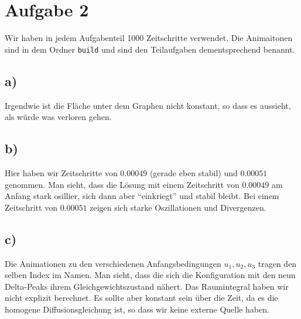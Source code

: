\section{Aufgabe 2}
Wir haben in jedem Aufgabenteil 1000 Zeitschritte verwendet.
Die Animaitonen sind in dem Ordner \verb|build| und sind den Teilaufgaben dementsprechend benannt.
\subsection*{a)}
Irgendwie ist die Fläche unter dem Graphen nicht konstant, so dass es aussieht, als würde was verloren gehen.
\subsection*{b)}
Hier haben wir Zeitschritte von $0.00049$ (gerade eben stabil) und $0.00051$ genommen.
Man sieht, dass die Lösung mit einem Zeitschritt von $0.00049$ am Anfang stark osillier, sich dann aber 
\enquote{einkriegt} und stabil bleibt. 
Bei einem Zeitschritt von $0.00051$ zeigen sich starke Oszillationen und Divergenzen.
\subsection*{c)}
Die Animationen zu den verschiedenen Anfangsbedingungen $u_1, u_2, u_3$ tragen den selben Index im Namen.
Man sieht, dass die sich die Konfiguration mit den neun Delta-Peaks ihrem Gleichgewichtszustand nähert.
Das Raumintegral haben wir nicht explizit berechnet. Es sollte aber konstant sein über die Zeit, da es die homogene 
Diffusionsgleichung ist, so dass wir keine externe Quelle haben.